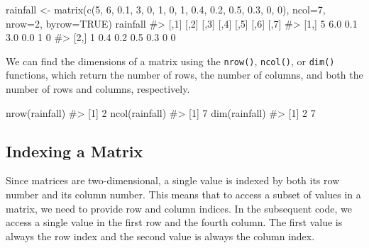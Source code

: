 \documentclass[
  letterpaper,
]{latex/krantz}
\makeatletter
\newenvironment{Shaded}{\begin{snugshade}}{\end{snugshade}}
\newcommand{\AttributeTok}[1]{\textcolor[rgb]{0.40,0.45,0.13}{#1}}
\newcommand{\CommentTok}[1]{\textcolor[rgb]{0.37,0.37,0.37}{#1}}
\newcommand{\ConstantTok}[1]{\textcolor[rgb]{0.56,0.35,0.01}{#1}}
\newcommand{\DecValTok}[1]{\textcolor[rgb]{0.68,0.00,0.00}{#1}}
\newcommand{\FloatTok}[1]{\textcolor[rgb]{0.68,0.00,0.00}{#1}}
\newcommand{\FunctionTok}[1]{\textcolor[rgb]{0.28,0.35,0.67}{#1}}
\newcommand{\NormalTok}[1]{\textcolor[rgb]{0.00,0.23,0.31}{#1}}
\newcommand{\OtherTok}[1]{\textcolor[rgb]{0.00,0.23,0.31}{#1}}
\newenvironment{kframe}{%
\medskip{}
\setlength{\fboxsep}{.8em}
 \def\at@end@of@kframe{}%
 \ifinner\ifhmode%
  \def\at@end@of@kframe{\end{minipage}}%
  \begin{minipage}{\columnwidth}%
 \fi\fi%
 \def\FrameCommand##1{\hskip\@totalleftmargin \hskip-\fboxsep
 \colorbox{shadecolor}{##1}\hskip-\fboxsep
     \hskip-\linewidth \hskip-\@totalleftmargin \hskip\columnwidth}%
 \MakeFramed {\advance\hsize-\width
   \@totalleftmargin\z@ \linewidth\hsize
   \@setminipage}}%
 {\par\unskip\endMakeFramed%
 \at@end@of@kframe}
\renewenvironment{Shaded}{\begin{kframe}}{\end{kframe}}
\makeatother
\begin{document}
\begin{Shaded}
\begin{Highlighting}[]
\NormalTok{rainfall }\OtherTok{\textless{}{-}} \FunctionTok{matrix}\NormalTok{(}\FunctionTok{c}\NormalTok{(}\DecValTok{5}\NormalTok{, }\DecValTok{6}\NormalTok{, }\FloatTok{0.1}\NormalTok{, }\DecValTok{3}\NormalTok{, }\DecValTok{0}\NormalTok{, }\DecValTok{1}\NormalTok{, }\DecValTok{0}\NormalTok{, }\DecValTok{1}\NormalTok{, }\FloatTok{0.4}\NormalTok{, }\FloatTok{0.2}\NormalTok{, }
                     \FloatTok{0.5}\NormalTok{, }\FloatTok{0.3}\NormalTok{, }\DecValTok{0}\NormalTok{, }\DecValTok{0}\NormalTok{), }
                   \AttributeTok{ncol=}\DecValTok{7}\NormalTok{, }\AttributeTok{nrow=}\DecValTok{2}\NormalTok{, }\AttributeTok{byrow=}\ConstantTok{TRUE}\NormalTok{)}
\NormalTok{rainfall}
\CommentTok{\#\textgreater{}      [,1] [,2] [,3] [,4] [,5] [,6] [,7]}
\CommentTok{\#\textgreater{} [1,]    5  6.0  0.1  3.0  0.0    1    0}
\CommentTok{\#\textgreater{} [2,]    1  0.4  0.2  0.5  0.3    0    0}
\end{Highlighting}
\end{Shaded}

We can find the dimensions of a matrix using the
\texttt{nrow()},
\texttt{ncol()}, or
\texttt{dim()} functions, which
return the number of rows, the number of columns, and both the number of
rows and columns, respectively.

\begin{Shaded}
\begin{Highlighting}[]
\FunctionTok{nrow}\NormalTok{(rainfall)}
\CommentTok{\#\textgreater{} [1] 2}
\FunctionTok{ncol}\NormalTok{(rainfall)}
\CommentTok{\#\textgreater{} [1] 7}
\FunctionTok{dim}\NormalTok{(rainfall)}
\CommentTok{\#\textgreater{} [1] 2 7}
\end{Highlighting}
\end{Shaded}

\subsection{\texorpdfstring{Indexing a Matrix
}{Indexing a Matrix }}\label{indexing-a-matrix}

Since matrices are two-dimensional, a single value is indexed by both
its row number and its column number. This means that to access a subset
of values in a matrix, we need to provide row and column indices. In the
subsequent code, we access a single value in the first row and the
fourth column. The first value is always the row index and the second
value is always the column index.
\end{document}
